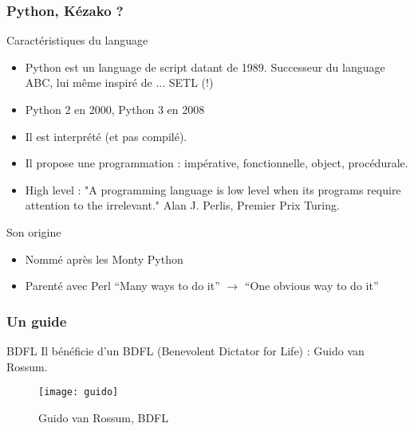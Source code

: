 \documentclass{beamer}
\begin{document}
\begin{frame}
  \frametitle{Python, Kézako ?}

  
  \begin{block}{Caractéristiques du language}
    \begin{itemize}
    \item Python est un language de script datant de 1989. Successeur du
      language ABC, lui même inspiré de ... SETL (!)
    \item Python 2 en 2000, Python 3 en 2008
    \item Il est interprété (et pas compilé).
    \item Il propose une programmation : impérative, fonctionnelle,
      object, procédurale.
    \item High level :  "A programming language is low level when its
      programs require attention to the irrelevant." Alan J. Perlis,
      Premier Prix Turing.
    \end{itemize}
  \end{block}
  \pause
  \begin{block}{Son origine}
    \begin{itemize}
    \item Nommé après les Monty Python
    \item Parenté avec Perl ``Many ways to do it'' $\rightarrow$ ``One
      obvious way to do it''
    \end{itemize}
  \end{block}
  
\end{frame}

\begin{frame}
  \frametitle{Un guide}

  \begin{block}{BDFL}
    Il bénéficie d'un BDFL (Benevolent Dictator for Life) : Guido van
    Rossum.  
  \end{block}
  
  \begin{figure}[H]
    \centering
    \texttt{[image: guido]}
    \caption{Guido van Rossum, BDFL}
    \label{fig:guido}
  \end{figure}


\end{frame}
\end{document}
